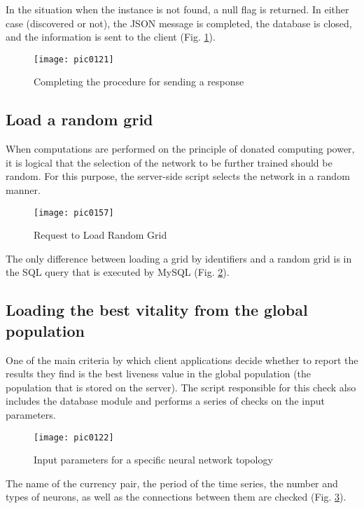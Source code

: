 In the situation when the instance is not found, a null flag is returned. In either case (discovered or not), the JSON message is completed, the database is closed, and the information is sent to the client (Fig. \ref{fig:pic0121}).

\begin{figure}[h]
\centering
\texttt{[image: pic0121]}
\caption{Completing the procedure for sending a response}
\label{fig:pic0121}
\end{figure}
\FloatBarrier

\subsection{Load a random grid}

When computations are performed on the principle of donated computing power, it is logical that the selection of the network to be further trained should be random. For this purpose, the server-side script selects the network in a random manner.

\begin{figure}[h]
\centering
\texttt{[image: pic0157]}
\caption{Request to Load Random Grid}
\label{fig:pic0157}
\end{figure}
\FloatBarrier

The only difference between loading a grid by identifiers and a random grid is in the SQL query that is executed by MySQL (Fig. \ref{fig:pic0157}).

\subsection{Loading the best vitality from the global population}

One of the main criteria by which client applications decide whether to report the results they find is the best liveness value in the global population (the population that is stored on the server). The script responsible for this check also includes the database module and performs a series of checks on the input parameters.

\begin{figure}[h]
\centering
\texttt{[image: pic0122]}
\caption{Input parameters for a specific neural network topology}
\label{fig:pic0122}
\end{figure}
\FloatBarrier

The name of the currency pair, the period of the time series, the number and types of neurons, as well as the connections between them are checked (Fig. \ref{fig:pic0122}).

